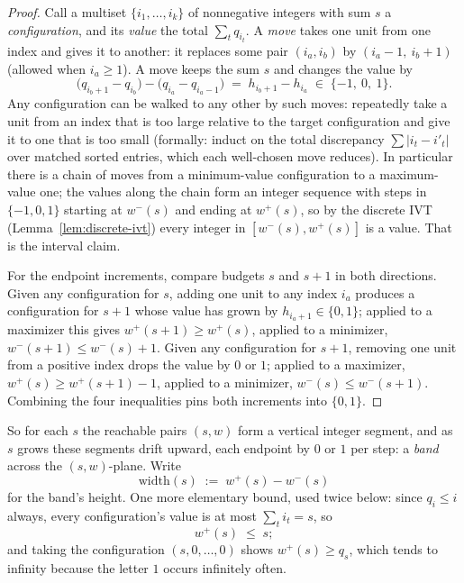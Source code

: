\documentclass[11pt,reqno]{amsart}
\theoremstyle{plain}
\theoremstyle{definition}
\theoremstyle{remark}
\begin{document}
\begin{proof}
Call a multiset $\{i_1, \dots, i_k\}$ of nonnegative integers with sum $s$ a
\emph{configuration}, and its \emph{value} the total $\sum_t q_{i_t}$. A
\emph{move} takes one unit from one index and gives it to another: it replaces some
pair $(i_a, i_b)$ by $(i_a - 1,\ i_b + 1)$ (allowed when $i_a \ge 1$). A move keeps
the sum $s$ and changes the value by
\[
  \big( q_{i_b + 1} - q_{i_b} \big) - \big( q_{i_a} - q_{i_a - 1} \big)
  \;=\; h_{i_b + 1} - h_{i_a} \;\in\; \{-1,\ 0,\ 1\} .
\]
Any configuration can be walked to any other by such moves: repeatedly take a unit
from an index that is too large relative to the target configuration and give it to
one that is too small (formally: induct on the total discrepancy $\sum |i_t -
i'_t|$ over matched sorted entries, which each well-chosen move reduces). In
particular there is a chain of moves from a minimum-value configuration to a
maximum-value one; the values along the chain form an integer sequence with steps in
$\{-1,0,1\}$ starting at $w^-(s)$ and ending at $w^+(s)$, so by the discrete IVT
(Lemma~\ref{lem:discrete-ivt}) every integer in $[w^-(s), w^+(s)]$ is a value. That
is the interval claim.

For the endpoint increments, compare budgets $s$ and $s+1$ in both directions.
Given any configuration for $s$, adding one unit to any index $i_a$ produces a
configuration for $s+1$ whose value has grown by $h_{i_a+1} \in \{0,1\}$; applied to
a maximizer this gives $w^+(s+1) \ge w^+(s)$, applied to a minimizer, $w^-(s+1) \le
w^-(s) + 1$. Given any configuration for $s+1$, removing one unit from a positive
index drops the value by $0$ or $1$; applied to a maximizer, $w^+(s) \ge w^+(s+1) -
1$, applied to a minimizer, $w^-(s) \le w^-(s+1)$. Combining the four
inequalities pins both increments into $\{0,1\}$.
\end{proof}

So for each $s$ the reachable pairs $(s, w)$ form a vertical integer segment, and as
$s$ grows these segments drift upward, each endpoint by $0$ or $1$ per step: a
\emph{band} across the $(s,w)$-plane. Write
\[
  \mathrm{width}(s) \;:=\; w^+(s) - w^-(s)
\]
for the band's height. One more elementary bound, used twice below: since $q_i \le
i$ always, every configuration's value is at most $\sum_t i_t = s$, so
\begin{equation}\label{eq:wplus-le-s}
  w^+(s) \;\le\; s ;
\end{equation}
and taking the configuration $(s, 0, \dots, 0)$ shows $w^+(s) \ge q_s$, which tends
to infinity because the letter $1$ occurs infinitely often.
\end{document}
